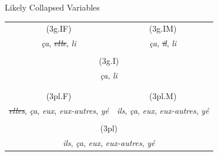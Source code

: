 \documentclass{beamer}\usepackage[]{graphicx}\usepackage[]{color}
\newcommand{\lexi}[1]{\textit{#1}}
\begin{document}
    \begin{frame}{Likely Collapsed Variables}
      \centering
      \begin{tabular}{c c}
        (3g.IF)                                                                  & (3g.IM) \\
        \lexi{ça}, \sout{\lexi{elle}}, \lexi{li}                                 & \lexi{ça}, \sout{\lexi{il}}, \lexi{li} \\
                                                                                 & \\
        \multicolumn{2}{c}{(3g.I)} \\
        \multicolumn{2}{c}{\lexi{ça}, \lexi{li}} \\
                                                                                 & \\
        \hline
                                                                                 & \\
        (3pl.F)                                                                  & (3pl.M) \\
        \sout{\lexi{elles}}, \lexi{ça}, \lexi{eux}, \lexi{eux-autres}, \lexi{yé} & \lexi{ils}, \lexi{ça}, \lexi{eux}, \lexi{eux-autres}, \lexi{yé} \\
                                                                                 & \\
        \multicolumn{2}{c}{(3pl)} \\
        \multicolumn{2}{c}{\lexi{ils}, \lexi{ça}, \lexi{eux}, \lexi{eux-autres}, \lexi{yé}} \\
      \end{tabular}
    \end{frame}
\end{document}

